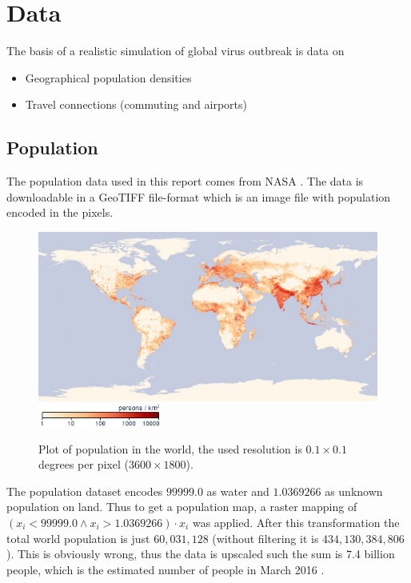 \section{Data}

The basis of a realistic simulation of global virus outbreak is data on
\begin{itemize}
	\item Geographical population densities
	\item Travel connections (commuting and airports)
\end{itemize}

\subsection{Population}
The population data used in this report comes from NASA \cite{nasa-population}. The data is downloadable in a GeoTIFF file-format which is an image file with population encoded in the pixels.

\begin{figure}[H]
	\centering
	\includegraphics[width=1.0 \textwidth]{plots/nasa_population}
	\includegraphics[width=4cm]{plots/nasa_population_colorbar}
	\caption{Plot of population in the world, the used resolution is $0.1 \times 0.1$ degrees per pixel ($3600 \times 1800$).}
\end{figure}

The population dataset encodes $99999.0$ as water and $1.0369266$ as unknown population on land. Thus to get a population map, a raster mapping of $(x_i < 99999.0 \wedge x_i > 1.0369266) \cdot x_i$ was applied. After this transformation the total world population is just $60,031,128$ (without filtering it is $434,130,384,806$). This is obviously wrong, thus the data is upscaled such the sum is 7.4 billion people, which is the estimated number of people in March 2016 \cite{wiki-world-population}.

